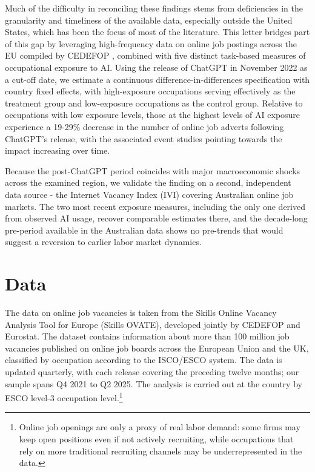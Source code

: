 \documentclass[11pt]{article}
\begin{document}
Much of the difficulty in reconciling these findings stems from deficiencies in the granularity and timeliness of the available data, especially outside the United States, which has been the focus of most of the literature. This letter bridges part of this gap by leveraging high-frequency data on online job postings across the EU compiled by CEDEFOP \citep{cedefop_skills_ovate}, combined with five distinct task-based measures of occupational exposure to AI. Using the release of ChatGPT in November 2022 as a cut-off date, we estimate a continuous difference-in-differences specification with country fixed effects, with high-exposure occupations serving effectively as the treatment group and low-exposure occupations as the control group. Relative to occupations with low exposure levels, those at the highest levels of AI exposure experience a 19-29\% decrease in the number of online job adverts following ChatGPT's release, with the associated event studies pointing towards the impact increasing over time.

Because the post-ChatGPT period coincides with major macroeconomic shocks across the examined region, we validate the finding on a second, independent data source - the Internet Vacancy Index (IVI) covering Australian online job markets. The two most recent exposure measures, including the only one derived from observed AI usage, recover comparable estimates there, and the decade-long pre-period available in the Australian data shows no pre-trends that would suggest a reversion to earlier labor market dynamics.

\section{Data}

The data on online job vacancies is taken from the Skills Online Vacancy Analysis Tool for Europe (Skills OVATE), developed jointly by CEDEFOP and Eurostat. The dataset contains information about more than 100 million job vacancies published on online job boards across the European Union and the UK, classified by occupation according to the ISCO/ESCO system. The data is updated quarterly, with each release covering the preceding twelve months; our sample spans Q4 2021 to Q2 2025. The analysis is carried out at the country by ESCO level-3 occupation level.\footnote{Online job openings are only a proxy of real labor demand: some firms may keep open positions even if not actively recruiting, while occupations that rely on more traditional recruiting channels may be underrepresented in the data.}
\end{document}
